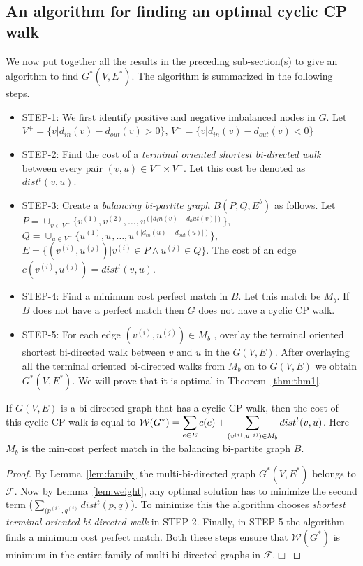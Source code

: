 \documentclass[runningheads]{llncs}
\begin{document}
\subsection{An algorithm for finding an optimal cyclic CP walk}
We now put together all the results in the preceding sub-section(s) to give an algorithm to find $G^*(V,E^*)$.
The algorithm is summarized in the following steps.

\begin{itemize}
\item {\sf STEP-1:} We first identify positive and negative imbalanced nodes in $G$. 
Let $V^+ = \{v | d_{in}(v) - d_{out}(v) > 0\}$, $V^- =\{v | d_{in}(v) - d_{out}(v) < 0\}$
\item {\sf STEP-2:} Find the cost of a {\em terminal oriented shortest bi-directed walk} between every pair 
$(v,u) \in V^+\times V^-$. Let this cost be denoted as $dist^t(v,u)$.
\item {\sf STEP-3:} Create a {\em balancing bi-partite graph} $B(P,Q,E^b)$ as follows. Let $P = \displaystyle\cup_{v\in V^+} \{v^{(1)},v^{(2)},\ldots, v^{(|d_in(v)-d_out(v)|)}\}$, $Q = \displaystyle\cup_{u\in V^-} \{u^{(1)},u^{},\ldots, u^{(|d_{in}(u)-d_{out}(u)|)}\}$, $E = \{(v^{(i)},u^{(j)}) | v^{(i)} \in P \wedge u^{(j)} \in Q\}$. The cost of an edge $c(v^{(i)},u^{(j)}) = dist^t(v,u)$. 
\item {\sf STEP-4:} Find a minimum cost perfect match in $B$. Let this match be $M_b$. If $B$ does not have a
perfect match then $G$ does not have a cyclic CP walk.
\item {\sf STEP-5:} For each edge $(v^{(i)}, u^{(j)}) \in M_b$ , overlay the terminal oriented shortest bi-directed
walk between $v$ and $u$ in the $G(V,E)$. After overlaying all the terminal oriented bi-directed walks from $M_b$ on to 
$G(V,E)$ we obtain $G^*(V,E^*)$. We will prove that it is optimal in Theorem~\ref{thm:thm1}.
\end{itemize}

\begin{theorem}
\label{thm:thm1}
If $G(V,E)$ is a bi-directed graph that has a cyclic CP walk, then the cost of this cyclic CP walk is equal to 
${\cal W}(G^*) = \displaystyle\sum_{e\in E}c(e) + \displaystyle\sum_{(v^{(i)},u^{(j)})\in M_b}dist^t(v,u)$. Here
$M_b$ is the min-cost perfect match in the balancing bi-partite graph $B$.
\end{theorem}
\begin{proof}
By Lemma~\ref{lem:family} the multi-bi-directed graph $G^*(V,E^*)$ belongs to $\mathcal{F}$. Now by Lemma~\ref{lem:weight},
any optimal solution has to minimize the second term ($\sum_{(p^{(i)},q^{(j)}}dist^t(p,q)$). To minimize this the
algorithm chooses {\em shortest terminal oriented bi-directed walk} in {\sf STEP-2}. Finally, in {\sf STEP-5} the 
algorithm finds a minimum cost perfect match. Both these steps ensure that $\mathcal{W}(G^*)$ is minimum in the entire
family of multi-bi-directed graphs in $\mathcal{F}$.$\Box$
\end{proof}
\end{document}
